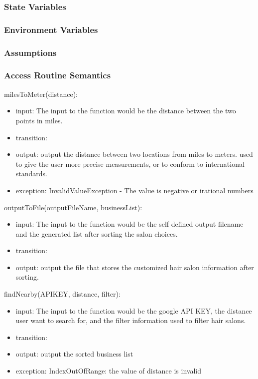 \documentclass[12pt, titlepage]{article}
\begin{document}
\subsubsection{State Variables}

\subsubsection{Environment Variables}

\subsubsection{Assumptions}

\subsubsection{Access Routine Semantics}

\noindent milesToMeter(distance):
\begin{itemize}
\item input: The input to the function would be the distance between the two points in miles.
\item transition:  
\item output: output the distance between two locations from miles to meters. used to give the user more precise measurements, or to conform to international standards. 
\item exception: InvalidValueException - The value is negative or irational numbers 
\end{itemize}

\noindent outputToFile(outputFileName, businessList):
\begin{itemize}
\item input: The input to the function would be the self defined output filename and the generated list after sorting the salon choices.
\item transition:  
\item output: output the file that stores the customized hair salon information after sorting. 
\end{itemize}

\noindent findNearby(APIKEY, distance, filter):
\begin{itemize}
\item input: The input to the function would be the google API KEY, the distance user want to search for, and the filter information used to filter hair salons.
\item transition:  
\item output: output the sorted business list
\item exception: IndexOutOfRange: the value of distance is invalid
\end{itemize}
\end{document}
